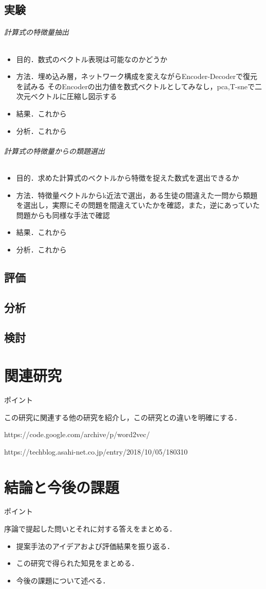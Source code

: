 \documentclass[a4j,11pt,report]{jsbook}
\newcommand{\point}[1]{
\begin{itembox}[l]{ポイント}
  #1
\end{itembox}
}
\begin{document}
\section{実験}
\subparagraph{計算式の特徴量抽出}
\begin{itemize}
  \item 目的．数式のベクトル表現は可能なのかどうか
  \item 方法．埋め込み層，ネットワーク構成を変えながらEncoder-Decoderで復元を試みる
  そのEncoderの出力値を数式ベクトルとしてみなし，pca,T-sneで二次元ベクトルに圧縮し図示する
  \item 結果．これから
  \item 分析．これから
\end{itemize}

\subparagraph{計算式の特徴量からの類題選出}
\begin{itemize}
  \item 目的．求めた計算式のベクトルから特徴を捉えた数式を選出できるか
  \item 方法．特徴量ベクトルからk近法で選出，ある生徒の間違えた一問から類題を選出し，実際にその問題を間違えていたかを確認，また，逆にあっていた問題からも同様な手法で確認
  \item 結果．これから
  \item 分析．これから
\end{itemize}
\section{評価}
\section{分析}
\section{検討}





\chapter{関連研究\label{ch:relatedwork}}
\point{
この研究に関連する他の研究を紹介し，この研究との違いを明確にする．

https://code.google.com/archive/p/word2vec/

https://techblog.asahi-net.co.jp/entry/2018/10/05/180310


}


\chapter{結論と今後の課題 \label{ch:conclusion}}
\point{
序論で提起した問いとそれに対する答えをまとめる．
\begin{itemize}
  \item 提案手法のアイデアおよび評価結果を振り返る．
  \item この研究で得られた知見をまとめる．
  \item 今後の課題について述べる．
\end{itemize}
}
\fi
\end{document}
